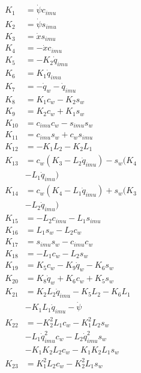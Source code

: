 \begin{multicols}{2}
\begin{align}
K_{1} &= \dot{\psi}c_{imu} \nonumber \\
K_{2} &= \dot{\psi}s_{imu} \nonumber \\
K_{3} &= \dot{x}s_{imu} \nonumber \\
K_{4} &= -\dot{x}c_{imu} \nonumber \\
K_{5} &= -K_{2}\dot{q}_{imu} \nonumber \\
K_{6} &= K_{1}\dot{q}_{imu} \nonumber \\
K_{7} &= - \dot{q}_{w} - \dot{q}_{imu} \nonumber \\
K_{8} &= K_{1}c_{w} - K_{2}s_{w} \nonumber \\
K_{9} &= K_{2}c_{w} + K_{1}s_{w} \nonumber \\
K_{10} &= c_{imu}c_{w} - s_{imu}s_{w} \nonumber \\
K_{11} &= c_{imu}s_{w} + c_{w}s_{imu} \nonumber \\
K_{12} &= - K_{1}L_2 - K_{2}L_1 \nonumber \\
K_{13} &= c_{w}(K_{3} - L_2\dot{q}_{imu}) - s_{w}(K_{4}  \nonumber \\
&- L_1\dot{q}_{imu}) \nonumber \\
K_{14} &= c_{w}(K_{4} - L_1\dot{q}_{imu}) + s_{w}(K_{3}  \nonumber \\
&- L_2\dot{q}_{imu}) \nonumber \\
K_{15} &= - L_2c_{imu} - L_1s_{imu} \nonumber \\
K_{16} &= L_1s_{w} - L_2c_{w} \nonumber \\
K_{17} &= s_{imu}s_{w} - c_{imu}c_{w} \nonumber \\
K_{18} &= - L_1c_{w} - L_2s_{w} \nonumber \\
K_{19} &= K_{5}c_{w} - K_{9}\dot{q}_{w} - K_{6}s_{w} \nonumber \\
K_{20} &= K_{8}\dot{q}_{w} + K_{6}c_{w} + K_{5}s_{w} \nonumber \\
K_{21} &= K_{2}L_2\dot{q}_{imu} - K_{5}L_2 - K_{6}L_1  \nonumber \\
&- K_{1}L_1\dot{q}_{imu} - \dot{\psi} \nonumber \\
K_{22} &= - K_{2}^2L_1c_{w} - K_{1}^2L_2s_{w}  \nonumber \\
&- L_1\dot{q}_{imu}^2c_{w} - L_2\dot{q}_{imu}^2s_{w}  \nonumber \\
&- K_{1}K_{2}L_2c_{w} - K_{1}K_{2}L_1s_{w} \nonumber \\
K_{23} &= K_{1}^2L_2c_{w} - K_{2}^2L_1s_{w}  \nonumber \\

\end{align}
\end{multicols}

